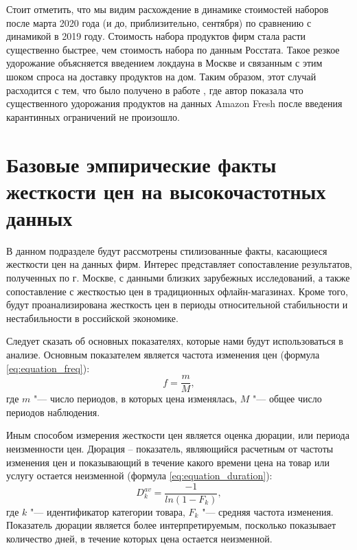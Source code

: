 Стоит отметить, что мы видим расхождение в динамике стоимостей наборов после марта 2020 года (и до, приблизительно, сентября) по сравнению с динамикой в 2019 году. Стоимость набора продуктов фирм стала расти существенно быстрее, чем стоимость набора по данным Росстата. Такое резкое удорожание объясняется введением локдауна в Москве и связанным с этим шоком спроса на доставку продуктов на дом. Таким образом, этот случай расходится с тем, что было получено в работе \cite{hillen2021covid}, где автор показала что существенного удорожания продуктов на данных Amazon Fresh после введения карантинных ограничений не произошло. 

\section{Базовые эмпирические факты жесткости цен на высокочастотных данных}\label{sec:ch3/sec2}

В данном подразделе будут рассмотрены стилизованные факты, касающиеся жесткости цен на данных фирм. Интерес представляет сопоставление результатов, полученных по г. Москве, с данными близких зарубежных исследований, а также сопоставление с жесткостью цен в традиционных офлайн-магазинах. Кроме того, будут проанализирована жесткость цен в периоды относительной стабильности и нестабильности в российской экономике.

Следует сказать об основных показателях, которые нами будут использоваться в анализе. Основным показателем является частота изменения цен (формула \eqref{eq:equation_freq}):
\begin{equation}
	\label{eq:equation_freq}
	f=\frac{m}{M},
\end{equation}
где \( m \) "--- число периодов, в которых цена изменялась, \( M \) "--- общее число периодов наблюдения.

Иным способом измерения жесткости цен является оценка дюрации, или периода неизменности цен. Дюрация -- показатель, являющийся расчетным от частоты изменения цен и показывающий в течение какого времени цена на товар или услугу остается неизменной (формула \eqref{eq:equation_duration}):
\begin{equation}
	\label{eq:equation_duration}
	D_k^{av}=\frac{-1}{ln⁡(1-F_k)},
\end{equation}
где \( k \) "--- идентификатор категории товара, \( F_k \) "--- средняя частота изменения. Показатель дюрации является более интерпретируемым, посколько показывает количество дней, в течение которых цена остается неизменной.


